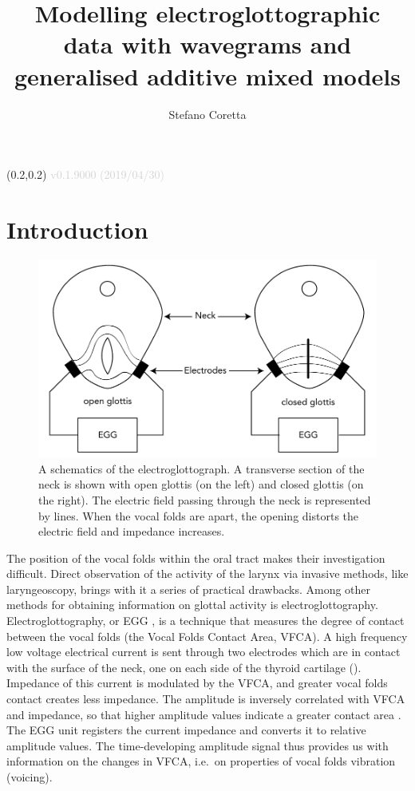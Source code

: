 \documentclass[
  11pt,
  a4paper,
]{article}
\title{Modelling electroglottographic data with wavegrams and generalised
additive mixed models}
\author{Stefano Coretta}
\date{}
\begin{document}
\begin{textblock}{3}(0.2,0.2)
  \textcolor{lightgray}{v0.1.9000 (2019/04/30)}
\end{textblock}
\maketitle

\hypertarget{introduction}{%
\section{Introduction}\label{introduction}}

\begin{figure}
  \centering
  \includegraphics{./img/egg-setup.pdf}
  \caption{A schematics of the electroglottograph. A transverse section of the neck is shown with open glottis (on the left) and closed glottis (on the right). The electric field passing through the neck is represented by lines. When the vocal folds are apart, the opening distorts the electric field and impedance increases.}
  \label{f:egg-setup}
\end{figure}

The position of the vocal folds within the oral tract makes their
investigation difficult. Direct observation of the activity of the
larynx via invasive methods, like laryngeoscopy, brings with it a series
of practical drawbacks. Among other methods for obtaining information on
glottal activity is electroglottography. Electroglottography, or EGG
\citep{fabre1957}, is a technique that measures the degree of contact
between the vocal folds (the Vocal Folds Contact Area, VFCA). A high
frequency low voltage electrical current is sent through two electrodes
which are in contact with the surface of the neck, one on each side of
the thyroid cartilage (). Impedance of this current is
modulated by the VFCA, and greater vocal folds contact creates less
impedance. The amplitude is inversely correlated with VFCA and
impedance, so that higher amplitude values indicate a greater contact
area \citep{titze1990}. The EGG unit registers the current impedance and
converts it to relative amplitude values. The time-developing amplitude
signal thus provides us with information on the changes in VFCA, i.e.~on
properties of vocal folds vibration (voicing).
\end{document}
